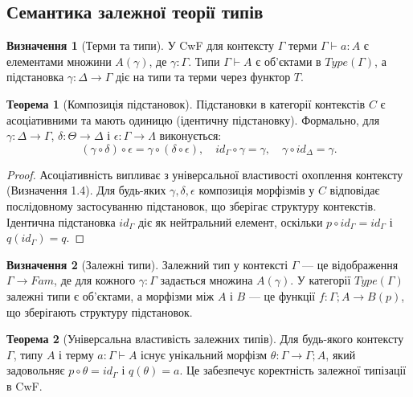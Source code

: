 \documentclass{article}
\theoremstyle{definition}
\newtheorem{definition}{Визначення}[section]
\newtheorem{theorem}{Теорема}[section]
\begin{document}
\subsection{Семантика залежної теорії типів}

\begin{definition}[Терми та типи]
У CwF для контексту $\Gamma$ терми $\Gamma\vdash a:A$ є елементами множини $A(\gamma)$, де $\gamma:\Gamma$. Типи $\Gamma\vdash A$ є об’єктами в $Type(\Gamma)$, а підстановка $\gamma:\Delta\rightarrow\Gamma$ діє на типи та терми через функтор $T$.
\end{definition}

\begin{theorem}[Композиція підстановок]
Підстановки в категорії контекстів $C$ є асоціативними та мають одиницю (ідентичну підстановку). Формально, для $\gamma:\Delta\rightarrow\Gamma$, $\delta:\Theta\rightarrow\Delta$ і $\epsilon:\Gamma\rightarrow\Lambda$ виконується:
\[
    (\gamma \circ \delta) \circ \epsilon = \gamma \circ (\delta \circ \epsilon), \quad id_{\Gamma} \circ \gamma = \gamma, \quad \gamma \circ id_{\Delta} = \gamma.
\]
\end{theorem}

\begin{proof}
Асоціативність випливає з універсальної властивості охоплення контексту (Визначення 1.4). Для будь-яких $\gamma,\delta,\epsilon$ композиція морфізмів у $C$ відповідає послідовному застосуванню підстановок, що зберігає структуру контекстів. Ідентична підстановка $id_{\Gamma}$ діє як нейтральний елемент, оскільки $p \circ id_{\Gamma} = id_{\Gamma}$ і $q(id_{\Gamma}) = q$.
\end{proof}

\begin{definition}[Залежні типи]
Залежний тип у контексті $\Gamma$ --- це відображення $\Gamma \rightarrow Fam$, де для кожного $\gamma:\Gamma$ задається множина $A(\gamma)$. У категорії $Type(\Gamma)$ залежні типи є об’єктами, а морфізми між $A$ і $B$ --- це функції $f: \Gamma;A \rightarrow B(p)$, що зберігають структуру підстановок.
\end{definition}

\begin{theorem}[Універсальна властивість залежних типів]
Для будь-якого контексту $\Gamma$, типу $A$ і терму $a:\Gamma\vdash A$ існує унікальний морфізм $\theta:\Gamma \rightarrow \Gamma;A$, який задовольняє $p \circ \theta = id_{\Gamma}$ і $q(\theta) = a$. Це забезпечує коректність залежної типізації в CwF.
\end{theorem}
\end{document}
